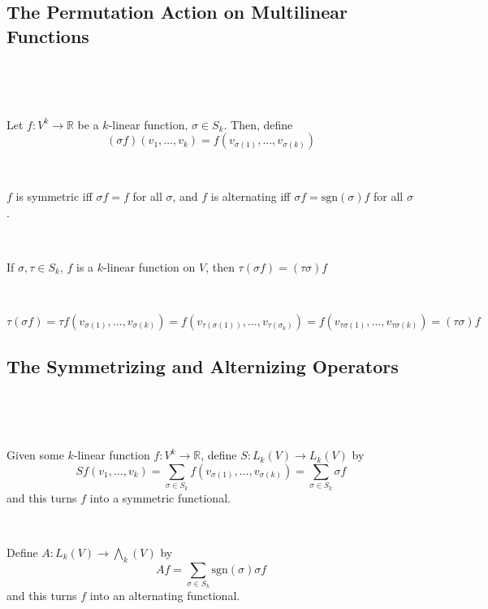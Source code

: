 \documentclass{article}
\begin{document}
\subsection{The Permutation Action on Multilinear Functions}
\

\begin{definition}
  \

  Let $f:V^k \to \mathbb{R}$ be a $k$-linear function, $\sigma \in S_k$. Then, define $$(\sigma f)(v_1, \dots, v_k) = f(v_{\sigma(1)}, \dots, v_{\sigma(k)})$$
\end{definition}

\begin{proposition}
  \

  $f$ is symmetric iff $\sigma f = f$ for all $\sigma$, and $f$ is alternating iff $\sigma f = \text{sgn}(\sigma)f$ for all $\sigma$.
\end{proposition}

\begin{lemma}
  \

  If $\sigma, \tau \in S_k$, $f$ is a $k$-linear function on $V$, then $\tau(\sigma f) = (\tau\sigma)f$
\end{lemma}

\begin{customproof}
  \

  $$\tau(\sigma f) = \tau f(v_{\sigma(1)}, \dots, v_{\sigma(k)}) = f(v_{\tau(\sigma(1))}, \dots, v_{\tau(\sigma_k)}) = f(v_{\tau\sigma(1)}, \dots, v_{\tau\sigma(k)}) = (\tau\sigma)f$$
\end{customproof}

\subsection{The Symmetrizing and Alternizing Operators}
\

\begin{definition}
  \

  Given some $k$-linear function $f: V^k \to \mathbb{R}$, define $S: L_k(V) \to L_k(V)$ by $$Sf(v_1, \dots, v_k) = \sum_{\sigma \in S_k} f(v_{\sigma(1)}, \dots, v_{\sigma(k)}) = \sum_{\sigma \in S_k} \sigma f$$and this turns $f$ into a symmetric functional.
\end{definition}

\begin{definition}
  \

  Define $A: L_k(V) \to \bigwedge_k(V)$ by $$Af = \sum_{\sigma \in S_k} \text{sgn}(\sigma) \sigma f$$and this turns $f$ into an alternating functional.
\end{definition}
\end{document}
